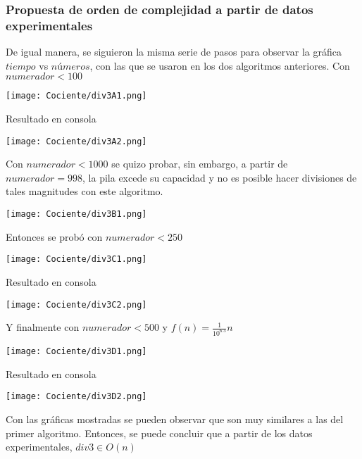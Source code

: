 \documentclass[12pt,twoside]{article}
\begin{document}
\subsubsection{Propuesta de orden de complejidad a partir de datos experimentales}
De igual manera, se siguieron la misma serie de pasos para observar la gráfica $tiempo$ vs $números$, con las que se usaron en los dos algoritmos anteriores.
Con $numerador < 100$
\begin{center}
    \texttt{[image: Cociente/div3A1.png]}
\end{center}
Resultado en consola
\begin{center}
    \texttt{[image: Cociente/div3A2.png]}
\end{center}
Con $numerador < 1000$ se quizo probar, sin embargo, a partir de $numerador = 998$, la pila excede su capacidad y no es posible hacer divisiones de tales magnitudes con este algoritmo.
\begin{center}
    \texttt{[image: Cociente/div3B1.png]}
\end{center}
Entonces se probó con $numerador < 250$
\begin{center}
    \texttt{[image: Cociente/div3C1.png]}
\end{center}
Resultado en consola
\begin{center}
    \texttt{[image: Cociente/div3C2.png]}
\end{center}
Y finalmente con $numerador < 500$ y $f(n) = \frac{1}{10^6.5}n$
\begin{center}
    \texttt{[image: Cociente/div3D1.png]}
\end{center}
Resultado en consola
\begin{center}
    \texttt{[image: Cociente/div3D2.png]}
\end{center}
Con las gráficas mostradas se pueden observar que son muy similares a las del primer algoritmo. Entonces, se puede concluir que a partir de los datos experimentales,\newline\newline
$div3 \in O(n)$
\end{document}
